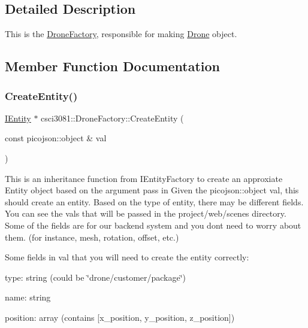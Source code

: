 \subsection{Detailed Description}
This is the \hyperlink{classcsci3081_1_1DroneFactory}{Drone\+Factory}, responsible for making \hyperlink{classcsci3081_1_1Drone}{Drone} object. 

\subsection{Member Function Documentation}
\mbox{\label{classcsci3081_1_1DroneFactory_a84b3bc534c666c4485383bce502056b8}} 
\subsubsection{\texorpdfstring{Create\+Entity()}{CreateEntity()}}
{\footnotesize\ttfamily \hyperlink{classentity__project_1_1IEntity}{I\+Entity} $\ast$ csci3081\+::\+Drone\+Factory\+::\+Create\+Entity (\begin{DoxyParamCaption}\item[{const picojson\+::object \&}]{val }\end{DoxyParamCaption})\hspace{0.3cm}{\ttfamily [virtual]}}



This is an inheritance function from I\+Entity\+Factory to create an approxiate Entity object based on the argument pass in Given the picojson\+::object val, this should create an entity. Based on the type of entity, there may be different fields. You can see the vals that will be passed in the project/web/scenes directory. Some of the fields are for our backend system and you don\textquotesingle{}t need to worry about them. (for instance, mesh, rotation, offset, etc.) 

Some fields in val that you will need to create the entity correctly\+:

type\+: string (could be \char`\"{}drone/customer/package\char`\"{})

name\+: string

position\+: array (contains \mbox{[}x\+\_\+position, y\+\_\+position, z\+\_\+position\mbox{]})

